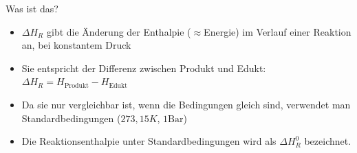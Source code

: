 	\begin{block}{Was ist das?}
	\begin{itemize}
		\item<+-> $\Delta H_R$ gibt die Änderung der Enthalpie ($\approx$Energie) im Verlauf einer Reaktion an, bei konstantem Druck
		\item<+-> Sie entspricht der Differenz zwischen Produkt und Edukt: $\Delta H_R = H_{\text{Produkt}} - H_{\text{Edukt}}$
		\item<+-> Da sie nur vergleichbar ist, wenn die Bedingungen gleich sind, verwendet man Standardbedingungen ($273,15 K$, $1 \text{Bar}$)
		\item<+-> Die Reaktionsenthalpie unter Standardbedingungen wird als $\Delta H_R^0$ bezeichnet.
	\end{itemize}
	\end{block}


